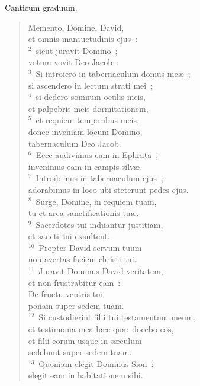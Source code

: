 \lettrine[lines=3,image=true,loversize=0.05,lraise=-0.03]{C}{}anticum graduum. \begin{flushleft}\begin{verse}\vspace{6pt}Memento, Domine, David,\\ et omnis mansuetudinis ejus~:\\
${}^{2}$~sicut juravit Domino~;\\ votum vovit Deo Jacob~:\\
${}^{3}$~Si introiero in tabernaculum domus me\ae~;\\ si ascendero in lectum strati mei~;\\
${}^{4}$~si dedero somnum oculis meis,\\ et palpebris meis dormitationem,\\
${}^{5}$~et requiem temporibus meis,\\ donec inveniam locum Domino,\\ tabernaculum Deo Jacob.\\
${}^{6}$~Ecce audivimus eam in Ephrata~;\\ invenimus eam in campis silv\ae .\\
${}^{7}$~Introibimus in tabernaculum ejus~;\\ adorabimus in loco ubi steterunt pedes ejus.\\
${}^{8}$~Surge, Domine, in requiem tuam,\\ tu et arca sanctificationis tu\ae .\\
${}^{9}$~Sacerdotes tui induantur justitiam,\\ et sancti tui exsultent.\\
${}^{10}$~Propter David servum tuum\\ non avertas faciem christi tui.\\
${}^{11}$~Juravit Dominus David veritatem,\\ et non frustrabitur eam~:\\ De fructu ventris tui\\ ponam super sedem tuam.\\
${}^{12}$~Si custodierint filii tui testamentum meum,\\ et testimonia mea h\ae c qu\ae\ docebo eos,\\ et filii eorum usque in s\ae culum\\ sedebunt super sedem tuam.\\
${}^{13}$~Quoniam elegit Dominus Sion~:\\ elegit eam in habitationem sibi.\\

\end{verse}
\end{flushleft}
